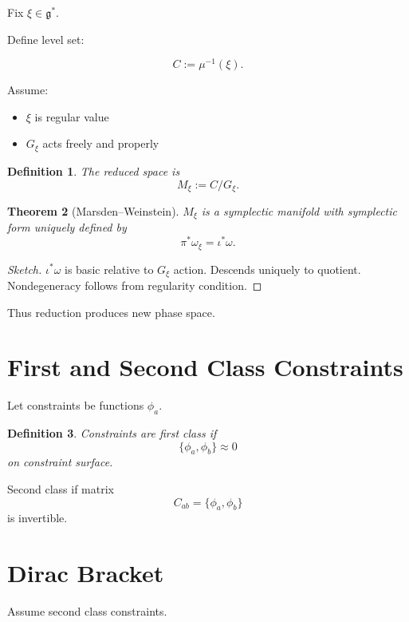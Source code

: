 \documentclass[11pt]{book}
\newtheorem{theorem}{Theorem}[chapter]
\newtheorem{definition}[theorem]{Definition}
\begin{document}
Fix $\xi \in \mathfrak{g}^*$.

Define level set:

\[
C := \mu^{-1}(\xi).
\]

Assume:

\begin{itemize}
\item $\xi$ is regular value
\item $G_\xi$ acts freely and properly
\end{itemize}

\begin{definition}
The reduced space is
\[
M_\xi := C / G_\xi.
\]
\end{definition}

\begin{theorem}[Marsden--Weinstein]
$M_\xi$ is a symplectic manifold
with symplectic form uniquely defined by
\[
\pi^*\omega_\xi = \iota^*\omega.
\]
\end{theorem}

\begin{proof}[Sketch]
$\iota^*\omega$ is basic relative to $G_\xi$ action.
Descends uniquely to quotient.
Nondegeneracy follows from regularity condition.
\end{proof}

Thus reduction produces new phase space.

\section{First and Second Class Constraints}

Let constraints be functions $\phi_a$.

\begin{definition}
Constraints are first class if
\[
\{\phi_a,\phi_b\}
\approx 0
\]
on constraint surface.
\end{definition}

Second class if matrix
\[
C_{ab} = \{\phi_a,\phi_b\}
\]
is invertible.

\section{Dirac Bracket}

Assume second class constraints.
\end{document}

